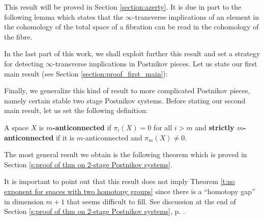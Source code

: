 This result will be proved in Section \ref{section:azerty}. It is due in part to the following lemma which states that the $\infty$-transverse implications of an element in the cohomology of the total space of a fibration can be read in the cohomology of the fibre.

\begin{lem}\label{l:transversity from the fibre}
\label{lem_transverse_fibre}

\end{lem}
\theoremstyle{plain}
\newtheorem*{lem_transverse_fibre}{\mbox{\ref{lem_transverse_fibre}.~Lemma}}

In the last part of this work, we shall exploit further this result and set a strategy for detecting $\infty$-transverse implications in Postnikov pieces. Let us state our first main result (see Section \ref{section:proof_first_main}):

\begin{thm}\label{t:no exponent for spaces with two homotopy groups}
\label{thm_first_main}

\end{thm}
\theoremstyle{plain}
\newtheorem*{thm_first_main}{\mbox{\ref{thm_first_main}.~Theorem}}

Finally, we generalize this kind of result to more complicated Postnikov pieces, namely certain stable two stage Postnikov systems. Before stating our second main result, let us set the following definition:

\begin{defn}
A space $X$ is {\bf $m$-anticonnected} if $\pi_i(X)=0$ for all $i>m$ and {\bf strictly $m$-anticonnected} if it is $m$-anticonnected and $\pi_m(X)\not=0$.
\end{defn}

The most general result we obtain is the following theorem which is proved in Section \ref{s:proof of thm on 2-stage Postnikov systems}.

\begin{thm}\label{t:no exponent for some Postnikov pieces}
\label{thm_second_main}

\end{thm}
\theoremstyle{plain}
\newtheorem*{thm_second_main}{\mbox{\ref{thm_second_main}.~Theorem}}

It is important to point out that this result does not imply Theorem \ref{t:no exponent for spaces with two homotopy groups} since there is a ``homotopy gap'' in dimension $m+1$ that seems difficult to fill. See discussion at the end of Section \ref{s:proof of thm on 2-stage Postnikov systems}, p. \pageref{s:proof of thm on 2-stage Postnikov systems:discussion}.

\endinput